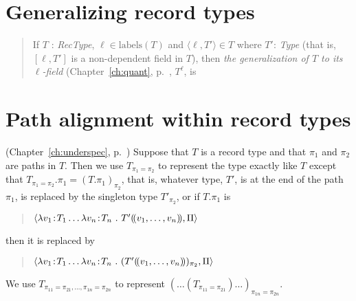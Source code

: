\section{Generalizing record types}
\label{app:gen-rectypes}

\begin{quote}
If $T$ : \textit{RecType}, $\ell\in\text{labels}(T)$ and
$\langle\ell,T'\rangle\in T$ where $T'$: \textit{Type} (that is,
$[\ell,T']$ is a non-dependent field in $T$), then \textit{the
  generalization of $T$ to its $\ell$-field} (Chapter~\ref{ch:quant}, p.~\pageref{ex:gen-to-ell}, $T^\ell$, is
\begin{quote}
\end{quote}
\end{quote}

\section{Path alignment within record types}
\label{app:path-align-rectype}
(Chapter~\ref{ch:underspec}, p.~\pageref{pg:path-alignment-types}) Suppose that $T$ is a record type and that $\pi_1$ and $\pi_2$ are
paths in $T$.  Then we use $T_{\pi_1=\pi_2}$ to represent the type
exactly like $T$ except that $T_{\pi_1=\pi_2}.\pi_1=
(T.\pi_1)_{\pi_2}$, that is, whatever type, $T'$, is at the end of the path
$\pi_1$, is replaced by the singleton type $T'_{\pi_2}$, or if
$T.\pi_1$ is
\begin{quote}
$\langle\lambda v_1\!:\!T_1\ldots \lambda v_n\!:\!T_n\
.\ T'(\!(v_1,\ldots,v_n)\!), \Pi\rangle$
\end{quote}
then it is replaced by
\begin{quote}
$\langle\lambda v_1\!:\!T_1\ldots \lambda v_n\!:\!T_n\ 
.\ (T'\dep{v_1,\ldots,v_n})_{\pi_2}, \Pi\rangle$
\end{quote}
We use $T_{\pi_{11}=\pi_{21},\ldots,\pi_{1n}=\pi_{2n}}$ to
represent $(\ldots(T_{\pi_{11}=\pi_{21}})\ldots)_{\pi_{1n}=\pi_{2n}}$.

